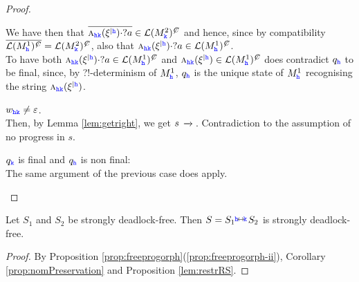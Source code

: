\begin{proof}
\begin{description}
\begin{description}
We have then that $\Dual{\symb{\HH\KK}{\restrictup{\xi}{\HH}}\cdot ?a}\in\lang{M^2_\KK}^\mC$
and hence, since by compatibility $\Dual{\lang{M^1_\HH}^\mC} = \lang{M^2_\KK}^\mC$, also that
 $\symb{\HH\KK}{\restrictup{\xi}{\HH}}\cdot ?a\in \lang{M^1_\HH}^\mC$.\\
 To have both $\symb{\HH\KK}{\restrictup{\xi}{\HH}}\cdot ?a\in\lang{M^1_\HH}^\mC $ and 
 $\symb{\HH\KK}{\restrictup{\xi}{\HH}}\in \lang{M^1_\HH}^\mC$
does contradict $q_\HH$ to be final, since,
 by ?!-determinism of $M^1_\HH$, ${q}_\HH$ is the unique state of $M^1_\HH$ 
recognising the string $\symb{\HH\KK}{\restrictup{\xi}{\HH}}$. 
 \item
 $w_{\HH\KK}\neq\varepsilon$.\\
Then, by Lemma \ref{lem:getright}, we get $s \lts{}$. Contradiction to the assumption of no progress in $s$.
\end{description}


\item $q_\KK$ is final and $q_\HH$ is non final: \\
The same argument of the previous case does apply.
\end{description}
\end{proof}

\begin{corollary}%
\label{prop:dfPreservation}
Let $S_1$ and $S_2$ be strongly deadlock-free.
Then $S = {S_{1}} \connect{\HH}{\KK} {S_{2}}$ is strongly deadlock-free.
\end{corollary}
\begin{proof}
By Proposition \ref{prop:freeprogorph}(\ref{prop:freeprogorph-ii}),  Corollary \ref{prop:nomPreservation} and Proposition \ref{lem:restrRS}.
\end{proof}












